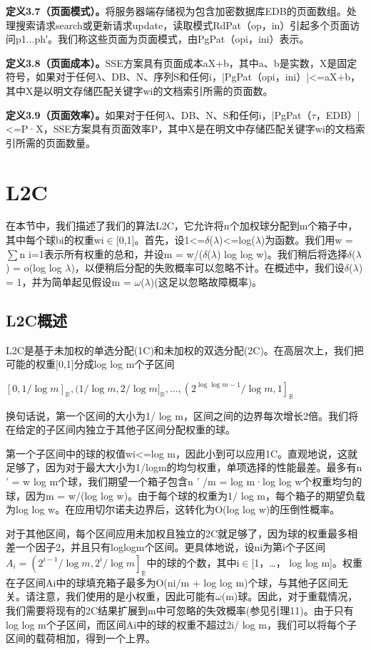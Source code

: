 \documentclass[UTF8]{article}
\begin{document}
\textbf{定义3.7（页面模式）。}将服务器端存储视为包含加密数据库EDB的页面数组。处理搜索请求search或更新请求update，读取模式RdPat（op，in）引起多个页面访问p1...ph′。我们称这些页面为页面模式，由PgPat（opi，ini）表示。

\textbf{定义3.8（页面成本）。}SSE方案具有页面成本aX+b，其中a、b是实数，X是固定符号，如果对于任何$\lambda$、DB、N、序列S和任何i，|PgPat（opi，ini）|<=aX+b，其中X是以明文存储匹配关键字wi的文档索引所需的页面数。

\textbf{定义3.9（页面效率）。}如果对于任何$\lambda$、DB、N、S和任何i，|PgPat（$\tau$，EDB）|<=P·X，SSE方案具有页面效率P，其中X是在明文中存储匹配关键字wi的文档索引所需的页面数量。

\section{L2C}
在本节中，我们描述了我们的算法L2C，它允许将n个加权球分配到m个箱子中，其中每个球bi的权重wi$\in$[0,1]。首先，设1<=$\delta$($\lambda$)<=log($\lambda$)为函数。我们用w =$\sum$n i=1表示所有权重的总和，并设m = w/($\delta$($\lambda$) log log w)。我们稍后将选择$\delta$($\lambda$) = o(log log $\lambda$)，以便稍后分配的失败概率可以忽略不计。在概述中，我们设$\delta$($\lambda$) = 1，并为简单起见假设m = $\omega$($\lambda$)(这足以忽略故障概率)。

\subsection{L2C概述}
L2C是基于未加权的单选分配(1C)和未加权的双选分配(2C)。在高层次上，我们把可能的权重[0,1]分成log log m个子区间

$[0,1 / \log m]_{\mathbb{R}},(1 / \log m, 2 / \log m]_{\mathbb{R}}, \ldots,\left(2^{\log \log m-1} / \log m, 1\right]_{\mathbb{R}}$


换句话说，第一个区间的大小为1/ log m，区间之间的边界每次增长2倍。我们将在给定的子区间内独立于其他子区间分配权重的球。

第一个子区间中的球的权值wi<=log m，因此小到可以应用1C。直观地说，这就足够了，因为对于最大大小为1/logm的均匀权重，单项选择的性能最差。最多有n ' = w log m个球，我们期望一个箱子包含n ' /m = log m·log log w个权重均匀的球，因为m = w/(log log w)。由于每个球的权重为1/ log m，每个箱子的期望负载为log log w。在应用切尔诺夫边界后，这转化为O(log log w)的压倒性概率。


对于其他区间，每个区间应用未加权且独立的2C就足够了，因为球的权重最多相差一个因子2，并且只有loglogm个区间。更具体地说，设ni为第i个子区间$A_i=\left(2^{i-1} / \log m, 2^i / \log m\right]_{\mathbb{R}}$中的球的个数，其中i$\in$[1，…， log log m]。权重在子区间Ai中的球填充箱子最多为O(ni/m + log log m)个球，与其他子区间无关。请注意，我们使用的是小权重，因此可能有$\omega$(m)球。因此，对于重载情况，我们需要将现有的2C结果扩展到m中可忽略的失效概率(参见引理11)。由于只有log log m个子区间，而区间Ai中的球的权重不超过2i/ log m，我们可以将每个子区间的载荷相加，得到一个上界。
\end{document}
